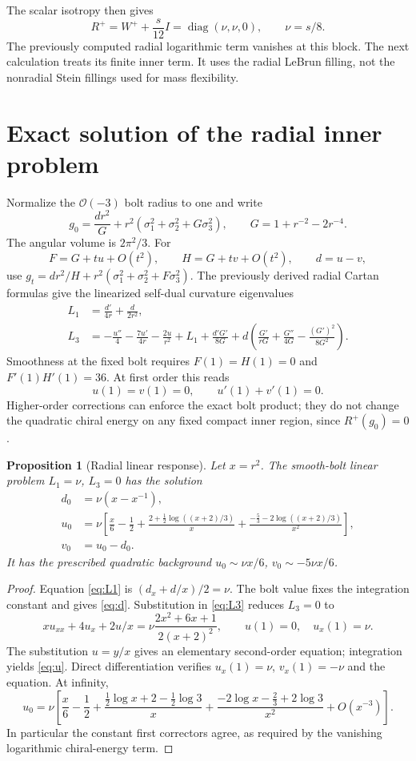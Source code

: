 \documentclass[11pt]{article}
\newtheorem{proposition}{Proposition}
\begin{document}
The scalar isotropy then gives
\[
 R^+=W^++\frac{s}{12}I=\operatorname{diag}(\nu,\nu,0),
 \qquad \nu=s/8.
\]
The previously computed radial logarithmic term vanishes at this block.
The next calculation treats its finite inner term. It uses the radial
LeBrun filling, not the nonradial Stein fillings used for mass flexibility.

\section{Exact solution of the radial inner problem}
Normalize the $\mathcal O(-3)$ bolt radius to one and write
\[
 g_0=\frac{dr^2}{G}+r^2(\sigma_1^2+\sigma_2^2+G\sigma_3^2),
 \qquad G=1+r^{-2}-2r^{-4}.
\]
The angular volume is $2\pi^2/3$. For
\[
 F=G+tu+O(t^2),\qquad H=G+tv+O(t^2),\qquad d=u-v,
\]
use $g_t=dr^2/H+r^2(\sigma_1^2+\sigma_2^2+F\sigma_3^2)$.
The previously derived radial Cartan formulas give the linearized
self-dual curvature eigenvalues
\begin{align}
 L_1&=\frac{d'}{4r}+\frac d{2r^2},\label{eq:L1}\\
 L_3&=-\frac{u''}{4}-\frac{7u'}{4r}-\frac{2u}{r^2}+L_1
 +\frac{d'G'}{8G}
 +d\left(\frac{G'}{rG}+\frac{G''}{4G}
                    -\frac{(G')^2}{8G^2}\right).\label{eq:L3}
\end{align}
Smoothness at the fixed bolt requires $F(1)=H(1)=0$ and
$F'(1)H'(1)=36$. At first order this reads
\[
 u(1)=v(1)=0,\qquad u'(1)+v'(1)=0.
\]
Higher-order corrections can enforce the exact bolt product; they do not
change the quadratic chiral energy on any fixed compact inner region,
since $R^+(g_0)=0$.

\begin{proposition}[Radial linear response]
Let $x=r^2$. The smooth-bolt linear problem $L_1=\nu$, $L_3=0$
has the solution
\begin{align}
 d_0&=\nu(x-x^{-1}),\label{eq:d}\\
 u_0&=\nu\left[
 \frac x6-\frac12+
 \frac{2+\tfrac12\log((x+2)/3)}x+
 \frac{-\tfrac53-2\log((x+2)/3)}{x^2}\right],\label{eq:u}\\
 v_0&=u_0-d_0.\nonumber
\end{align}
It has the prescribed quadratic background
$u_0\sim\nu x/6$, $v_0\sim-5\nu x/6$.
\end{proposition}
\begin{proof}
Equation \eqref{eq:L1} is $(d_x+d/x)/2=\nu$. The bolt value fixes
the integration constant and gives \eqref{eq:d}. Substitution in
\eqref{eq:L3} reduces $L_3=0$ to
\[
 xu_{xx}+4u_x+2u/x
   =\nu\frac{2x^2+6x+1}{2(x+2)^2},
 \qquad u(1)=0,\quad u_x(1)=\nu.
\]
The substitution $u=y/x$ gives an elementary second-order equation;
integration yields \eqref{eq:u}. Direct differentiation verifies
$u_x(1)=\nu$, $v_x(1)=-\nu$ and the equation. At infinity,
\[
 u_0=\nu\left[\frac x6-\frac12+
 \frac{\frac12\log x+2-\frac12\log3}{x}
 +\frac{-2\log x-\frac23+2\log3}{x^2}+O(x^{-3})\right].
\]
In particular the constant first correctors agree, as required by the
vanishing logarithmic chiral-energy term.
\end{proof}
\end{document}

